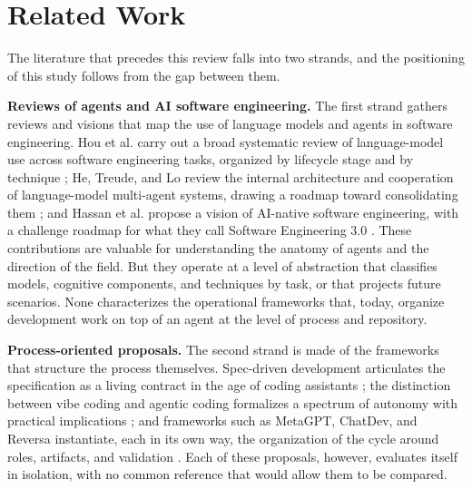 \section{Related Work}

The literature that precedes this review falls into two strands, and the positioning of this study follows from the gap between them.

\noindent\textbf{Reviews of agents and AI software engineering.} The first strand gathers reviews and visions that map the use of language models and agents in software engineering. Hou et al. carry out a broad systematic review of language-model use across software engineering tasks, organized by lifecycle stage and by technique \cite{hou2024llmse}; He, Treude, and Lo review the internal architecture and cooperation of language-model multi-agent systems, drawing a roadmap toward consolidating them \cite{JundaHe2025}; and Hassan et al. propose a vision of AI-native software engineering, with a challenge roadmap for what they call Software Engineering 3.0 \cite{AhmedEHassan2024}. These contributions are valuable for understanding the anatomy of agents and the direction of the field. But they operate at a level of abstraction that classifies models, cognitive components, and techniques by task, or that projects future scenarios. None characterizes the operational frameworks that, today, organize development work on top of an agent at the level of process and repository.

\noindent\textbf{Process-oriented proposals.} The second strand is made of the frameworks that structure the process themselves. Spec-driven development articulates the specification as a living contract in the age of coding assistants \cite{DeepakBabuPiskala2026}; the distinction between vibe coding and agentic coding formalizes a spectrum of autonomy with practical implications \cite{RanjanSapkota2025}; and frameworks such as MetaGPT, ChatDev, and Reversa instantiate, each in its own way, the organization of the cycle around roles, artifacts, and validation \cite{SiruiHong2023,ChenQian2023,Macedo2026}. Each of these proposals, however, evaluates itself in isolation, with no common reference that would allow them to be compared.

